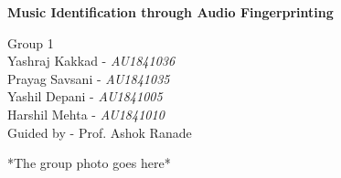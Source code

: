 \begin{titlepage}
    \begin{center}
        \vspace*{1cm}
        
        \Huge
        \textbf{Music Identification through Audio Fingerprinting}
        
        \vspace{1cm}
        \LARGE
        Group 1 \\
        \vspace*{3mm}
        Yashraj Kakkad - \textit{AU1841036} \\ 
        Prayag Savsani - \textit{AU1841035} \\
        Yashil Depani - \textit{AU1841005} \\ 
        Harshil Mehta - \textit{AU1841010} \\
        
        \vspace*{3mm}
        Guided by - Prof. Ashok Ranade

        \vspace*{5cm}
        *The group photo goes here*

    \end{center}
\end{titlepage}